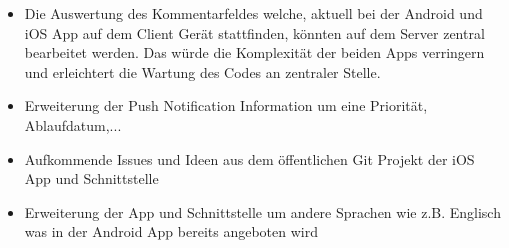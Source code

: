 \begin{itemize}
\item Die Auswertung des Kommentarfeldes welche, aktuell bei der Android und iOS App auf dem Client Gerät stattfinden, könnten auf dem Server zentral bearbeitet werden. Das würde die Komplexität der beiden Apps verringern und erleichtert die Wartung des Codes an zentraler Stelle.
\item Erweiterung der Push Notification Information um eine Priorität, Ablaufdatum,...
\item Aufkommende Issues und Ideen aus dem öffentlichen Git Projekt der iOS App und Schnittstelle
\item Erweiterung der App und Schnittstelle um andere Sprachen wie z.B. Englisch was in der Android App bereits angeboten wird

\end{itemize}

